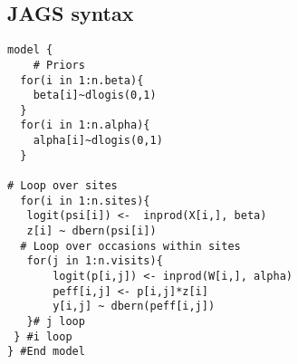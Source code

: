 \documentclass[12pt]{article}
\begin{document}
\pagebreak



\subsection{JAGS syntax}

\begin{verbatim}
model {
	# Priors
  for(i in 1:n.beta){
    beta[i]~dlogis(0,1)
  }
  for(i in 1:n.alpha){
    alpha[i]~dlogis(0,1)
  }
  
# Loop over sites	
  for(i in 1:n.sites){
   logit(psi[i]) <-  inprod(X[i,], beta)
   z[i] ~ dbern(psi[i])
  # Loop over occasions within sites			
   for(j in 1:n.visits){
       logit(p[i,j]) <- inprod(W[i,], alpha)
       peff[i,j] <- p[i,j]*z[i]
       y[i,j] ~ dbern(peff[i,j])
   }# j loop
 } #i loop
} #End model

\end{verbatim}
\end{document}
